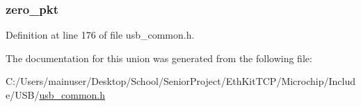 \subsubsection[{zero\+\_\+pkt}]{ zero\+\_\+pkt}\label{union_t_r_a_n_s_f_e_r___f_l_a_g_s_a9e4e83aa407fb630212de02d83d6057c}


Definition at line 176 of file usb\+\_\+common.\+h.



The documentation for this union was generated from the following file\+:\begin{DoxyCompactItemize}
\item 
C\+:/\+Users/mainuser/\+Desktop/\+School/\+Senior\+Project/\+Eth\+Kit\+T\+C\+P/\+Microchip/\+Include/\+U\+S\+B/\hyperlink{usb__common_8h}{usb\+\_\+common.\+h}\end{DoxyCompactItemize}
